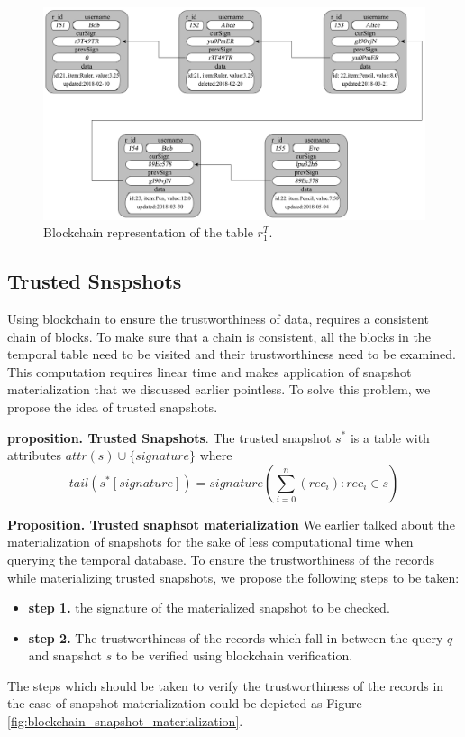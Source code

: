 \begin{figure}
	\centering
	\includegraphics[width=\textwidth]{figs/temporal_blockchain.pdf}
	\caption{Blockchain representation of the table $r_1^T$.}
	\label{fig:blockchain_representation}
\end{figure}

\subsection{Trusted Snspshots}
Using blockchain to ensure the trustworthiness of data, requires a consistent chain of blocks. To make sure that a chain is consistent, all the blocks in the temporal table need to be visited and their trustworthiness need to be examined. This computation requires linear time and makes application of snapshot materialization that we discussed earlier pointless. To solve this problem, we propose the idea of trusted snapshots.

\textbf{proposition. Trusted Snapshots}. The trusted snapshot $s^*$ is a table with attributes $attr(s)\cup \{signature\}$ where $$tail(s^*[signature]) = signature(\sum_{i=0}^n (rec_i):rec_i \in s)$$

\textbf{Proposition. Trusted snaphsot materialization} We earlier talked about the materialization of snapshots for the sake of less computational time when querying the temporal database. To ensure the trustworthiness of the records while materializing trusted snapshots, we propose the following steps to be taken:
\begin{itemize}
	\item \textbf{step 1.} the signature of the materialized snapshot to be checked.
	\item \textbf{step 2.} The trustworthiness of the records which fall in between the query $q$ and snapshot $s$ to be verified using blockchain verification.
\end{itemize}
The steps which should be taken to verify the trustworthiness of the records in the case of snapshot materialization could be depicted as Figure \ref{fig:blockchain_snapshot_materialization}.

